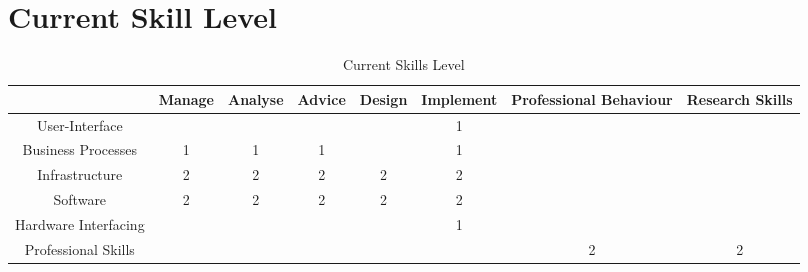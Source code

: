 
\section{Current Skill Level}
\label{sec:current}

\begin{table}[H]
	\centering
	\begin{tabular}{|c|c|c|c|c|c|c|c|}
		\hline
		& Manage & Analyse & Advice & Design & Implement & Professional Behaviour & Research Skills \\ \hline
		User-Interface & & & & & 1 & & \\ \hline
		Business Processes & 1 & 1 & 1 & & 1 &  &  \\ \hline
		Infrastructure & 2 & 2 & 2 & 2 & 2 & & \\ \hline
		Software & 2 & 2 & 2 & 2 & 2 & & \\ \hline
		Hardware Interfacing & & & & & 1 & & \\ \hline
		Professional Skills & & & & & & 2 & 2 \\ \hline
	\end{tabular}
	\caption{Current Skills Level}
	\label{currentskills}
\end{table}